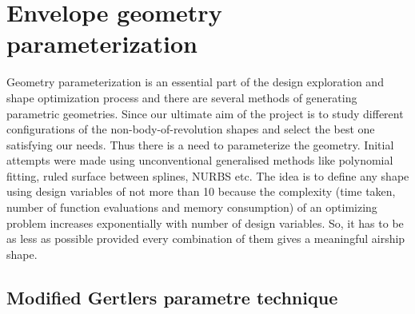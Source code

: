 \chapter{Envelope geometry parameterization}
\label{geometry}

Geometry parameterization is an essential part of the design exploration and shape optimization process and there are several methods of generating parametric geometries. Since our ultimate aim of the project is to study different configurations of the non-body-of-revolution shapes and select the best one satisfying our needs. Thus there is a need to parameterize the geometry. Initial attempts were made using unconventional generalised methods like polynomial fitting, ruled surface between splines, NURBS etc. The idea is to define any shape using design variables of not more than 10 because the complexity (time taken, number of function evaluations and memory consumption) of an optimizing problem increases exponentially with number of design variables. So, it has to be as less as possible provided every combination of them gives a meaningful airship shape.

\section{Modified Gertlers parametre technique}

